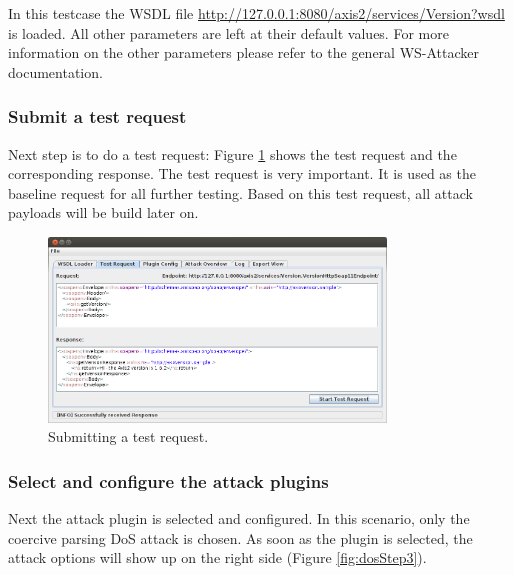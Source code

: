 In this testcase the WSDL file \url{http://127.0.0.1:8080/axis2/services/Version?wsdl} is loaded. All other parameters are left at their default values. 
For more information on the other parameters please refer to the general WS-Attacker documentation.

\subsubsection{Submit a test request}
\label{sec:submitting_a_test_request_dos}
Next step is to do a test request: Figure \ref{fig:dosStep2} shows
the test request and the corresponding response. 
The test request is very important. It is used as the baseline request for all further testing. 
Based on this test request, all attack payloads will be build later on.

\begin{figure}[h!]
    \begin{center}
        \includegraphics[width=0.8\textwidth]{img//dosStep2}
    \end{center}
    \caption{Submitting a test request.}
    \label{fig:dosStep2}
\end{figure}

\subsubsection{Select and configure the attack plugins}
\label{sec:attack_plugin_configuration_dos}

Next the attack plugin is selected and configured. In this scenario, only the coercive parsing DoS attack
is chosen. As soon as the plugin is selected, the attack options will show up on the right side (Figure \ref{fig:dosStep3}). 

